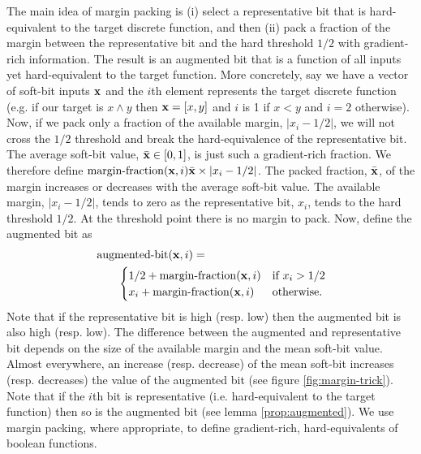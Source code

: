 \documentclass{article}
\theoremstyle{plain}
\theoremstyle{definition}
\theoremstyle{remark}
\begin{document}
The main idea of margin packing is (i) select a representative bit that is hard-equivalent to the target discrete function, and then (ii) pack a fraction of the margin between the representative bit and the hard threshold $1/2$ with gradient-rich information. The result is an augmented bit that is a function of all inputs yet hard-equivalent to the target function. More concretely, say we have a vector of soft-bit inputs ${\bf x}$ and the $i$th element represents the target discrete function (e.g. if our target is $x \wedge y$ then ${\bf x}=[x,y]$ and $i$ is 1 if $x<y$ and $i=2$ otherwise). Now, if we pack only a fraction of the available margin, $|x_{i}-1/2|$, we will not cross the $1/2$ threshold and break the hard-equivalence of the representative bit. The average soft-bit value, $\bar{\bf x} \in [0,1]$, is just such a gradient-rich fraction. We therefore define $\operatorname{margin-fraction}({\bf x}, i)  \bar{\bf x} \times \left|x_{i} - 1/2\right|$. The packed fraction, $\bar{\bf x}$, of the margin increases or decreases with the average soft-bit value. The available margin, $\left|x_{i} - 1/2\right|$, tends to zero as the representative bit, $x_{i}$, tends to the hard threshold $1/2$. At the threshold point there is no margin to pack. Now, define the augmented bit as
\begin{equation}
\begin{aligned}
&\operatorname{augmented-bit}({\bf x}, i) =\\
& ~~~~~~ 
\begin{cases}
1/2 + \operatorname{margin-fraction}({\bf x}, i) & \text{if } x_{i} > 1/2 \\
x_{i} + \operatorname{margin-fraction}({\bf x}, i) & \text{otherwise.}
\end{cases}
\end{aligned}
\label{eq:augmented-bit}
\end{equation}
Note that if the representative bit is high (resp. low) then the augmented bit is also high (resp. low). The difference between the augmented and representative bit depends on the size of the available margin and the mean soft-bit value. Almost everywhere, an increase (resp. decrease) of the mean soft-bit increases (resp. decreases) the value of the augmented bit (see figure \ref{fig:margin-trick}). Note that if the $i$th bit is representative (i.e. hard-equivalent to the target function) then so is the augmented bit (see lemma \ref{prop:augmented}). We use margin packing, where appropriate, to define gradient-rich, hard-equivalents of boolean functions.
\end{document}
